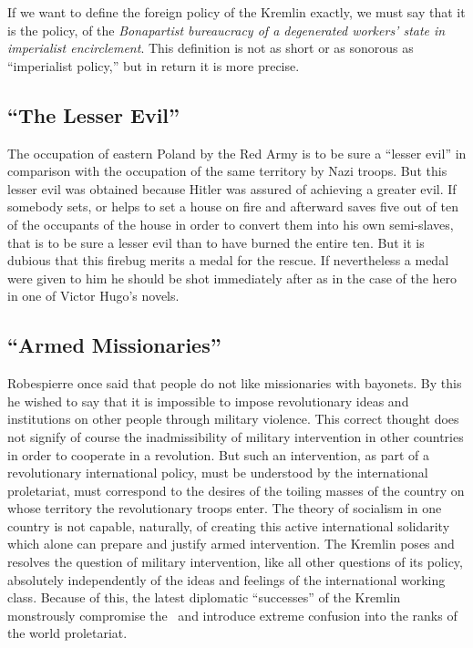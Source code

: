 If we want to define the foreign policy of the Kremlin exactly, we must say that it is the policy, of the \emph{Bonapartist bureaucracy of a degenerated workers’ state in imperialist encirclement}. This definition is not as short or as sonorous as “imperialist policy,” but in return it is more precise.

\subsection*{“The Lesser Evil”}

The occupation of eastern Poland by the Red Army is to be sure a “lesser evil” in comparison with the occupation of the same territory by Nazi troops. But this lesser evil was obtained because Hitler was assured of achieving a greater evil. If somebody sets, or helps to set a house on fire and afterward saves five out of ten of the occupants of the house in order to convert them into his own semi-slaves, that is to be sure a lesser evil than to have burned the entire ten. But it is dubious that this firebug merits a medal for the rescue. If nevertheless a medal were given to him he should be shot immediately after as in the case of the hero in one of Victor Hugo’s novels.

\subsection*{“Armed Missionaries”}

Robespierre once said that people do not like missionaries with bayonets. By this he wished to say that it is impossible to impose revolutionary ideas and institutions on other people through military violence. This correct thought does not signify of course the inadmissibility of military intervention in other countries in order to cooperate in a revolution. But such an intervention, as part of a revolutionary international policy, must be understood by the international proletariat, must correspond to the desires of the toiling masses of the country on whose territory the revolutionary troops enter. The theory of socialism in one country is not capable, naturally, of creating this active international solidarity which alone can prepare and justify armed intervention. The Kremlin poses and resolves the question of military intervention, like all other questions of its policy, absolutely independently of the ideas and feelings of the international working class. Because of this, the latest diplomatic “successes” of the Kremlin monstrously compromise the \USSR\ and introduce extreme confusion into the ranks of the world proletariat.

